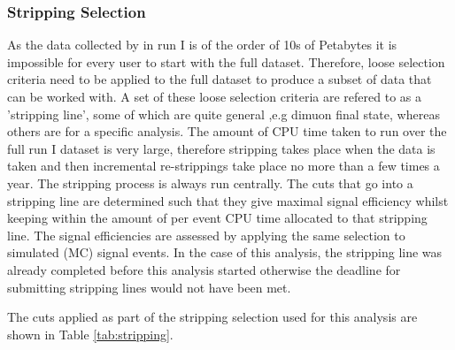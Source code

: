 \subsubsection{Stripping Selection}
\label{sec:Stripping}
As the data collected by \lhcb in run I is of the order of 10s of Petabytes it is impossible for every user to start with the full dataset.  Therefore, loose selection criteria need to be applied to the full dataset to produce a subset of data that can be worked with.  A set of these loose selection criteria are refered to as a 'stripping line', some of which are quite general ,e.g dimuon final state, whereas others are for a specific analysis.  The amount of CPU time taken to run over the full run I dataset is very large, therefore stripping takes place when the data is taken and then incremental re-strippings take place no more than a few times a year.  The stripping process is always run centrally.
The cuts that go into a stripping line are determined such that they give maximal signal efficiency whilst keeping within the amount of per event CPU time allocated to that stripping line.  The signal efficiencies are assessed by applying the same selection to simulated (MC) signal events.  In the case of this analysis, the stripping line was already completed before this analysis started otherwise the deadline for submitting stripping lines would not have been met.

The cuts applied as part of the stripping selection used for this analysis are shown in Table \ref{tab:stripping}.

